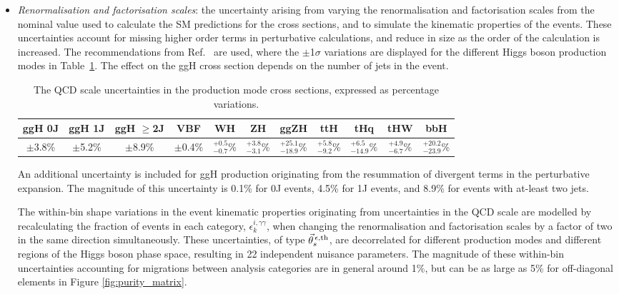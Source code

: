 \begin{itemize}
    \item \textit{Renormalisation and factorisation scales}: the uncertainty arising from varying the renormalisation and factorisation scales from the nominal value used to calculate the SM predictions for the cross sections, and to simulate the kinematic properties of the events. These uncertainties account for missing higher order terms in perturbative calculations, and reduce in size as the order of the calculation is increased. The recommendations from Ref.~\cite{deFlorian:2016spz} are used, where the $\pm$1$\sigma$ variations are displayed for the different Higgs boson production modes in Table~\ref{tab:qcdscale_variation}. The effect on the ggH cross section depends on the number of jets in the event.
    
    \begin{table}[htb]
        \caption[QCD scale uncertainties in production mode cross sections]{The QCD scale uncertainties in the production mode cross sections, expressed as percentage variations.}
        \label{tab:qcdscale_variation}
        \centering
        \footnotesize
        \setlength{\tabcolsep}{3pt}
        \renewcommand{\arraystretch}{2}
        \begin{tabular}{c|c|c|c|c|c|c|c|c|c|c}
            ggH 0J & ggH 1J & ggH $\geq$2J & VBF & WH & ZH & ggZH & ttH & tHq & tHW & bbH   \\ \hline
            $\pm$3.8\%  & $\pm$5.2\%  & $\pm$8.9\% & $\pm$0.4\% & $^{+0.5}_{-0.7}$\% & $^{+3.8}_{-3.1}$\%  & $^{+25.1}_{-18.9}$\% & $^{+5.8}_{-9.2}$\% & $^{+6.5}_{-14.9}$\% & $^{+4.9}_{-6.7}$\% & $^{+20.2}_{-23.9}$\% \\ 
        \end{tabular}
    \end{table}

    \noindent
    An additional uncertainty is included for ggH production originating from the resummation of divergent terms in the perturbative expansion. The magnitude of this uncertainty is 0.1\% for 0J events, 4.5\% for 1J events, and 8.9\% for events with at-least two jets.
    
    The within-bin shape variations in the event kinematic properties originating from uncertainties in the QCD scale are modelled by recalculating the fraction of events in each category, $\epsilon^{i,\gamma\gamma}_{k}$, when changing the renormalisation and factorisation scales by a factor of two in the same direction simultaneously. These uncertainties, of type $\vec{\theta}^{\,\epsilon,{\rm{th}}}_{s}$, are decorrelated for different production modes and different regions of the Higgs boson phase space, resulting in 22 independent nuisance parameters. The magnitude of these within-bin uncertainties accounting for migrations between analysis categories are in general around 1\%, but can be as large as 5\% for off-diagonal elements in Figure \ref{fig:purity_matrix}.
    

\end{itemize}
